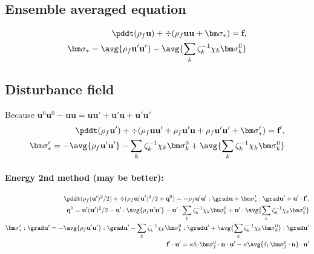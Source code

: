 \subsection{Ensemble averaged equation}
\begin{align}
    \pddt(\rho_f\textbf{u}) + \div (\rho_f \textbf{u}\textbf{u} + \bm\sigma_*)
    = \textbf{f},\\
    \bm\sigma_*
    =
    \avg{\rho_f \textbf{u}' \textbf{u}'}
    -\avg{\sum_k \zeta^{-1}_k \chi_k \bm\sigma_k^0  }
\end{align}
\subsection{Disturbance field}
Because $\textbf{u}^0 \textbf{u}^0 - \textbf{uu} = \textbf{uu}' + \textbf{u}' \textbf{u} + \textbf{u}' \textbf{u}'$
\begin{align}
    \pddt(\rho_f\textbf{u}')
    + \div (
        \rho_f \textbf{u}\textbf{u}'
        +\rho_f  \textbf{u}' \textbf{u}
        +\rho_f  \textbf{u}' \textbf{u}'
        + \bm\sigma_*')
    = \textbf{f}',\\
    \bm\sigma_*'
    =
    - \avg{\rho_f \textbf{u}' \textbf{u}'}
    -\sum_k \zeta^{-1}_k \chi_k \bm\sigma_k^0
    + \avg{\sum_k \zeta^{-1}_k \chi_k \bm\sigma_k^0  }
\end{align}

\paragraph{Energy 2nd method (may be better):}

\begin{align*}
    \pddt(\rho_f(\textbf{u}')^2/2)
    + \div (
        \rho_f \textbf{u}(\textbf{u}')^2/2
        + \textbf{q}^0
        )
    =
    - \rho_f \textbf{u}'\textbf{u}':\grad \textbf{u}
    + \bm\sigma_*' : \grad \textbf{u}'
    + \textbf{u}'\cdot \textbf{f}',\\
    \textbf{q}^0 =
    \textbf{u}' (\textbf{u}')^2/2
    -\textbf{u}'\cdot  \avg{\rho_f \textbf{u}' \textbf{u}'}
    - \textbf{u}' \cdot \sum_k \zeta^{-1}_k \chi_k \bm\sigma_k^0
    + \textbf{u}' \cdot  \avg{\sum_k \zeta^{-1}_k \chi_k \bm\sigma_k^0  }\\
    \bm\sigma_*': \grad \textbf{u}'
    =
    - \avg{\rho_f \textbf{u}' \textbf{u}'}:\grad \textbf{u}'
    -\sum_k \zeta^{-1}_k \chi_k \bm\sigma_k^0  :\grad \textbf{u}'
    + \avg{\sum_k \zeta^{-1}_k \chi_k \bm\sigma_k^0  }:\grad \textbf{u}'\\
    \textbf{f}' \cdot \textbf{u}'
    =
    \kappa \delta_\Gamma \bm\sigma_f^0 \cdot \textbf{n}  \cdot \textbf{u}'
    -  \kappa \avg{\delta_\Gamma \bm\sigma_f^0 \cdot \textbf{n}}
      \cdot \textbf{u}'
    \\
\end{align*}
